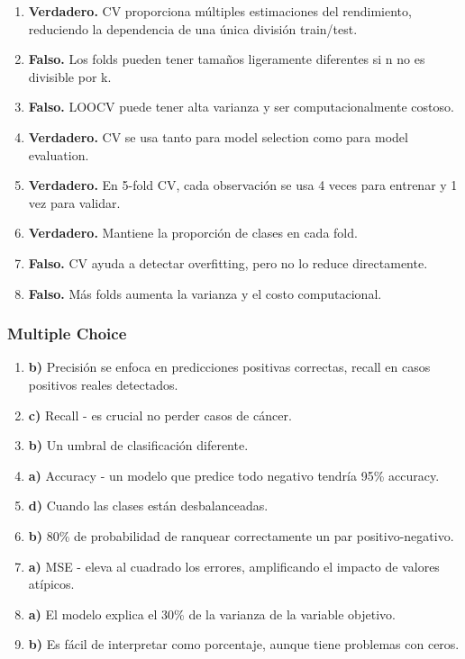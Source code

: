 \documentclass[12pt]{article}
\begin{document}
\begin{enumerate}
    \item \textbf{Verdadero.} CV proporciona múltiples estimaciones del rendimiento, reduciendo la dependencia de una única división train/test.
    \item \textbf{Falso.} Los folds pueden tener tamaños ligeramente diferentes si n no es divisible por k.
    \item \textbf{Falso.} LOOCV puede tener alta varianza y ser computacionalmente costoso.
    \item \textbf{Verdadero.} CV se usa tanto para model selection como para model evaluation.
    \item \textbf{Verdadero.} En 5-fold CV, cada observación se usa 4 veces para entrenar y 1 vez para validar.
    \item \textbf{Verdadero.} Mantiene la proporción de clases en cada fold.
    \item \textbf{Falso.} CV ayuda a detectar overfitting, pero no lo reduce directamente.
    \item \textbf{Falso.} Más folds aumenta la varianza y el costo computacional.
\end{enumerate}

\subsubsection{Multiple Choice}

\begin{enumerate}
    \item \textbf{b)} Precisión se enfoca en predicciones positivas correctas, recall en casos positivos reales detectados.
    \item \textbf{c)} Recall - es crucial no perder casos de cáncer.
    \item \textbf{b)} Un umbral de clasificación diferente.
    \item \textbf{a)} Accuracy - un modelo que predice todo negativo tendría 95\% accuracy.
    \item \textbf{d)} Cuando las clases están desbalanceadas.
    \item \textbf{b)} 80\% de probabilidad de ranquear correctamente un par positivo-negativo.
    \item \textbf{a)} MSE - eleva al cuadrado los errores, amplificando el impacto de valores atípicos.
    \item \textbf{a)} El modelo explica el 30\% de la varianza de la variable objetivo.
    \item \textbf{b)} Es fácil de interpretar como porcentaje, aunque tiene problemas con ceros.
\end{enumerate}
\end{document}
